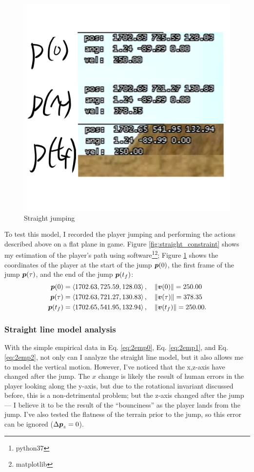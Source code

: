 \begin{figure}[H]
\begin{minipage}{.5\textwidth}
        \includegraphics[width=0.9\linewidth]{assets/2straightjumping.png}
        \caption{Straight jumping}
        \label{fig:2straightjumping}
    \end{minipage}
\end{figure}

To test this model, I recorded the player jumping and performing the actions described above on a flat plane in game. Figure \ref{fig:straight_constraint} shows my estimation of the player's path using software\footnote{python37}\footnote{matplotlib}; Figure \ref{fig:2straightjumping} shows the coordinates of the player at the start of the jump $\boldsymbol{p}(0)$, the first frame of the jump $\boldsymbol{p}(\tau)$, and the end of the jump $\boldsymbol{p}(t_f)$:
\begin{align}
 \boldsymbol{p}(0) &= \left\langle 1702.63, 725.59, 128.03 \right\rangle, \quad \|\boldsymbol{v}(0)\| = 250.00 \label{eq:2emp0}\\
 \boldsymbol{p}(\tau) &= \left\langle 1702.63, 721.27, 130.83 \right\rangle, \quad \|\boldsymbol{v}(\tau)\| = 378.35 \label{eq:2emp1}\\
 \boldsymbol{p}(t_f) &= \left\langle 1702.65,541.95, 132.94 \right\rangle, \quad \|\boldsymbol{v}(t_f)\| = 250.00 \label{eq:2emp2}.
\end{align}

\subsubsection{Straight line model analysis}
With the simple empirical data in Eq. \ref{eq:2emp0}, Eq. \ref{eq:2emp1}, and Eq. \ref{eq:2emp2}, not only can I analyze the straight line model, but it also allows me to model the vertical motion. However, I've noticed that the x,z-axis have changed after the jump. The $x$ change is likely the result of human errors in the player looking along the y-axis, but due to the rotational invariant discussed before, this is a non-detrimental problem; but the z-axis changed after the jump --- I believe it to be the result of the ``bounciness'' as the player lands from the jump. I've also tested the flatness of the terrain prior to the jump, so this error can be ignored ($\Delta \boldsymbol{p}_z = 0$).

